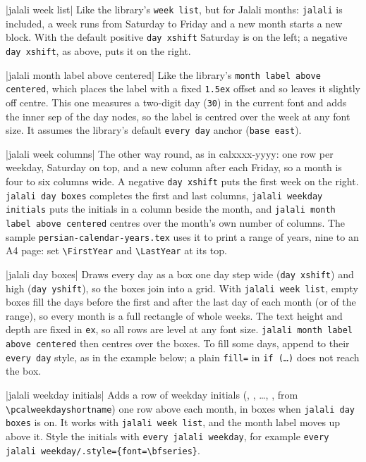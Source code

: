 \documentclass[11pt]{article}
\newcommand\pkg[1]{\textsf{#1}}
\newcommand\cs[1]{\texttt{\textbackslash #1}}
\begin{document}
\macro|jalali week list|
Like the library's \texttt{week list}, but for Jalali months: \texttt{jalali} is included, a week runs from
Saturday to Friday and a new month starts a new block. With the default positive \texttt{day xshift}
Saturday is on the left; a negative \texttt{day xshift}, as above, puts it on the right.

\macro|jalali month label above centered|
Like the library's \texttt{month label above centered}, which places the label with a fixed \texttt{1.5ex}
offset and so leaves it slightly off centre. This one measures a two-digit day (\texttt{30}) in the current
font and adds the inner sep of the day nodes, so the label is centred over the week at any font size.
It assumes the library's default \texttt{every day} anchor (\texttt{base east}).

\macro|jalali week columns|
The other way round, as in \pkg{calxxxx-yyyy}: one row per weekday, Saturday on top, and a new column after
each Friday, so a month is four to six columns wide. A negative \texttt{day xshift} puts the first week on
the right. \texttt{jalali day boxes} completes the first and last columns, \texttt{jalali weekday initials}
puts the initials in a column beside the month, and \texttt{jalali month label above centered} centres over
the month's own number of columns. The sample \texttt{persian-calendar-years.tex} uses it to print a range of
years, nine to an A4 page: set \cs{FirstYear} and \cs{LastYear} at its top.

\macro|jalali day boxes|
Draws every day as a box one day step wide (\texttt{day xshift}) and high (\texttt{day yshift}), so the boxes
join into a grid. With \texttt{jalali week list}, empty boxes fill the days before the first and after the last
day of each month (or of the range), so every month is a full rectangle of whole weeks. The text height and depth are fixed in \texttt{ex}, so all rows are level at any font size.
\texttt{jalali month label above centered} then centres over the boxes. To fill some days, append to their
\texttt{every day} style, as in the example below; a plain \texttt{fill=} in \texttt{if (\ldots)} does not
reach the box.

\macro|jalali weekday initials|
Adds a row of weekday initials (, , \ldots,
, from \cs{pcalweekdayshortname}) one row above each month, in boxes
when \texttt{jalali day boxes} is on. It works with \texttt{jalali week list}, and the month label moves
up above it. Style the initials with \texttt{every jalali weekday}, for example
\texttt{every jalali weekday/.style=\{font=\textbackslash bfseries\}}.
\end{document}
